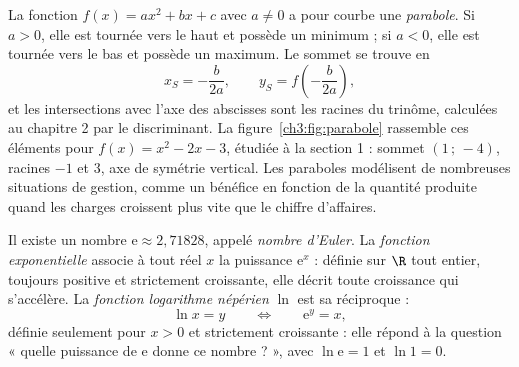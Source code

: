 La fonction $f(x) = ax^{2} + bx + c$ avec $a \neq 0$ a pour courbe une \emph{parabole}. Si $a > 0$, elle est tournée vers le haut et possède un minimum ; si $a < 0$, elle est tournée vers le bas et possède un maximum. Le sommet se trouve en
\[
x_S = -\frac{b}{2a}, \qquad y_S = f\left(-\frac{b}{2a}\right),
\]
et les intersections avec l'axe des abscisses sont les racines du trinôme, calculées au chapitre 2 par le discriminant. La figure~\ref{ch3:fig:parabole} rassemble ces éléments pour $f(x) = x^{2} - 2x - 3$, étudiée à la section 1 : sommet $(1\,;\,-4)$, racines $-1$ et $3$, axe de symétrie vertical. Les paraboles modélisent de nombreuses situations de gestion, comme un bénéfice en fonction de la quantité produite quand les charges croissent plus vite que le chiffre d'affaires.

\begin{center}
\label{ch3:fig:parabole}
\end{center}

\begin{definition}
Il existe un nombre $\mathrm{e} \approx 2{,}71828$, appelé \emph{nombre d'Euler}. La \emph{fonction exponentielle} associe à tout réel $x$ la puissance $\mathrm{e}^{x}$ : définie sur $\R$ tout entier, toujours positive et strictement croissante, elle décrit toute croissance qui s'accélère. La \emph{fonction logarithme népérien} $\ln$ est sa réciproque :
\[
\ln x = y \qquad \Longleftrightarrow \qquad \mathrm{e}^{y} = x,
\]
définie seulement pour $x > 0$ et strictement croissante : elle répond à la question « quelle puissance de $\mathrm{e}$ donne ce nombre ? », avec $\ln \mathrm{e} = 1$ et $\ln 1 = 0$.
\end{definition}

